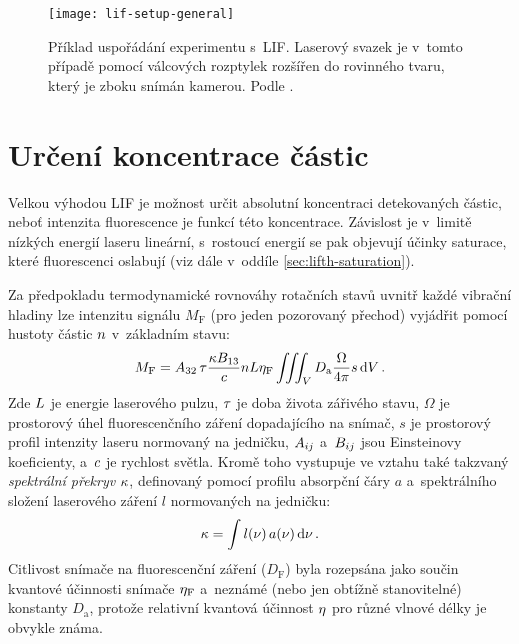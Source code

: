 \begin{figure}[htb]
	\centering
	\texttt{[image: lif-setup-general]}
	\caption{Příklad uspořádání experimentu s~LIF.
		Laserový svazek je v~tomto případě pomocí válcových rozptylek
		rozšířen do rovinného tvaru, který je zboku snímán kamerou.
		Podle \cite{lif-oh}.}
	\label{fig:lifth-setup}
\end{figure}

\section{Určení koncentrace částic}
\label{sec:lifth-concentration}
\providecommand\vol{V}
\providecommand\solidangle{\Omega}
\providecommand\sensabs{D_\text{a}}
\providecommand\lifsens{D_\text{F}}
\providecommand\rayleighsens{D_\text{R}}
\providecommand\lifsignal{M_\text{F}}
\providecommand\rayleighsignal{M_\text{R}}
\providecommand\lifeff{\qeff_\text{F}}
\providecommand\rayleigheff{\qeff_\text{R}}
\providecommand\rayleighdxsect{\dv{\sigma_\text{R}}{\solidangle}}
\providecommand\rayleighndens{\ndens_\text{R}}
\providecommand\enlaserrayleigh{L_\text{R}}
\providecommand\beamprofile{s}
\providecommand\cameraangle{\solidangle}
Velkou výhodou LIF je možnost určit absolutní koncentraci detekovaných částic,
neboť intenzita fluorescence je funkcí této koncentrace.
Závislost je v~limitě nízkých energií laseru lineární,
s~rostoucí energií se pak objevují účinky saturace,
které fluorescenci oslabují (viz dále v~oddíle \ref{sec:lifth-saturation}).

Za předpokladu termodynamické rovnováhy rotačních stavů uvnitř každé
vibrační hladiny lze intenzitu signálu $\lifsignal$ (pro jeden pozorovaný
přechod) vyjádřit pomocí hustoty částic $n$ v~základním stavu:
\begin{equation}
	\label{eq:lifth-lifsignal}
	\lifsignal = \einsteina32\,\lifetime
	\frac{\specoverlap \einsteinb13}{\lightspeed}
	\ndens \enlaser \lifeff
	\iiint_\vol \sensabs \frac{\solidangle}{4\pi} \beamprofile \dd{\vol}.
\end{equation}
Zde $L$ je energie laserového pulzu,
$\tau$ je doba života zářivého stavu,
$\cameraangle$ je prostorový úhel fluorescenčního záření dopadajícího
na snímač,
$\beamprofile$ je prostorový profil intenzity laseru normovaný na jedničku,
$A_{ij}$ a~$B_{ij}$ jsou Einsteinovy koeficienty,
a~$c$ je rychlost světla.
Kromě toho vystupuje ve vztahu také takzvaný
\emph{spektrální překryv} $\kappa$,
definovaný pomocí profilu absorpční čáry $a$
a~spektrálního složení laserového záření $l$ normovaných na jedničku:
\begin{equation}
	\kappa = \int l(\nu)\,a(\nu) \dd{\nu}.
\end{equation}
Citlivost snímače na fluorescenční záření ($\lifsens$) byla rozepsána
jako součin kvantové účinnosti snímače $\lifeff$ a~neznámé
(nebo jen obtížně stanovitelné) konstanty $\sensabs$,
protože relativní kvantová účinnost $\eta$ pro různé vlnové délky
je obvykle známa.

